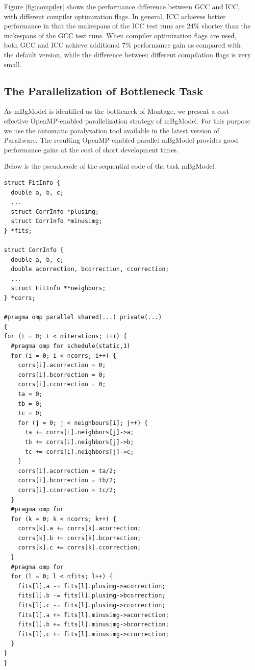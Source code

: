 Figure \ref{fig:compiler} shows the performance difference between GCC and ICC, with different compiler optimization flags. In general, ICC achieves better performance in that the makespans of the ICC test runs are 24\% shorter than the makespans of the GCC test runs. When compiler optimization flags are used, both GCC and ICC achieve additional 7\% performance gain as compared with the default version, while the difference between different compilation flags is very small.

\subsection{The Parallelization of Bottleneck Task}
\label{v1_sec:parallware}

As mBgModel is identified as the bottleneck of Montage, we present a cost-effective OpenMP-enabled parallelization strategy of mBgModel. For this purpose we use the automatic paralyzation tool available in the latest version of Parallware. The resulting OpenMP-enabled parallel mBgModel provides good performance gains at the cost of short development times. 

Below is the pseudocode of the sequential code of the task mBgModel. 

\begin{lstlisting}
struct FitInfo {
  double a, b, c;
  ...
  struct CorrInfo *plusimg;
  struct CorrInfo *minusimg;
} *fits;

struct CorrInfo {
  double a, b, c;
  double acorrection, bcorrection, ccorrection;
  ...
  struct FitInfo **neighbors;
} *corrs;

#pragma omp parallel shared(...) private(...)
{
for (t = 0; t < niterations; t++) {
  #pragma omp for schedule(static,1)
  for (i = 0; i < ncorrs; i++) {
    corrs[i].acorrection = 0;
    corrs[i].bcorrection = 0;
    corrs[i].ccorrection = 0;
    ta = 0;
    tb = 0;
    tc = 0;
    for (j = 0; j < neighbours[i]; j++) {
      ta += corrs[i].neighbors[j]->a;
      tb += corrs[i].neighbors[j]->b;
      tc += corrs[i].neighbors[j]->c;
    }
    corrs[i].acorrection = ta/2;
    corrs[i].bcorrection = tb/2;
    corrs[i].ccorrection = tc/2;
  }
  #pragma omp for
  for (k = 0; k < ncorrs; k++) {
    corrs[k].a += corrs[k].acorrection;
    corrs[k].b += corrs[k].bcorrection;
    corrs[k].c += corrs[k].ccorrection;
  }
  #pragma omp for
  for (l = 0; l < nfits; l++) {
    fits[l].a -= fits[l].plusimg->acorrection;
    fits[l].b -= fits[l].plusimg->bcorrection;
    fits[l].c -= fits[l].plusimg->ccorrection;
    fits[l].a += fits[l].minusimg->acorrection;
    fits[l].b += fits[l].minusimg->bcorrection;
    fits[l].c += fits[l].minusimg->ccorrection;
  }
}
}
\end{lstlisting}

